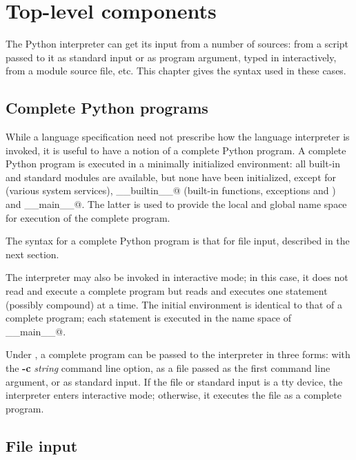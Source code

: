 \chapter{Top-level components}

The Python interpreter can get its input from a number of sources:
from a script passed to it as standard input or as program argument,
typed in interactively, from a module source file, etc.  This chapter
gives the syntax used in these cases.

\section{Complete Python programs}

While a language specification need not prescribe how the language
interpreter is invoked, it is useful to have a notion of a complete
Python program.  A complete Python program is executed in a minimally
initialized environment: all built-in and standard modules are
available, but none have been initialized, except for \verb@sys@
(various system services), \verb@__builtin__@ (built-in functions,
exceptions and \verb@None@) and \verb@__main__@.  The latter is used
to provide the local and global name space for execution of the
complete program.

The syntax for a complete Python program is that for file input,
described in the next section.

The interpreter may also be invoked in interactive mode; in this case,
it does not read and execute a complete program but reads and executes
one statement (possibly compound) at a time.  The initial environment
is identical to that of a complete program; each statement is executed
in the name space of \verb@__main__@.

Under {\UNIX}, a complete program can be passed to the interpreter in
three forms: with the {\bf -c} {\it string} command line option, as a
file passed as the first command line argument, or as standard input.
If the file or standard input is a tty device, the interpreter enters
interactive mode; otherwise, it executes the file as a complete
program.

\section{File input}

